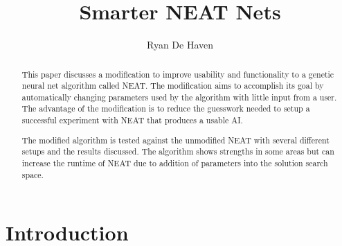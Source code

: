 \documentclass[12pt]{ucthesis} \newif\ifpdf \ifx\pdfoutput\undefined
\begin{document}
\title{Smarter NEAT Nets}

\author{Ryan De Haven}
  
 
      


\maketitle

\begin{frontmatter}

\copyrightpage

\approvalpage

 
\begin{abstract}
This paper discusses a modification to improve usability and functionality to a
genetic neural net algorithm called NEAT. The modification aims to accomplish
its goal by automatically changing parameters used by the algorithm with little
input from a user. The advantage of the modification is to reduce the guesswork
needed to setup a successful experiment with NEAT that produces a usable AI.

The modified algorithm is tested against the unmodified NEAT with several
different setups and the results discussed. The algorithm shows strengths in some areas
but can increase the runtime of NEAT due to addition of parameters into the
solution search space.

\end{abstract}

\begin{acknowledgements}

\end{acknowledgements}

\tableofcontents

\listoftables

\listoffigures

\end{frontmatter}

\pagestyle{plain}

\renewcommand{\baselinestretch}{1.66}


\chapter{Introduction}
\end{document}
